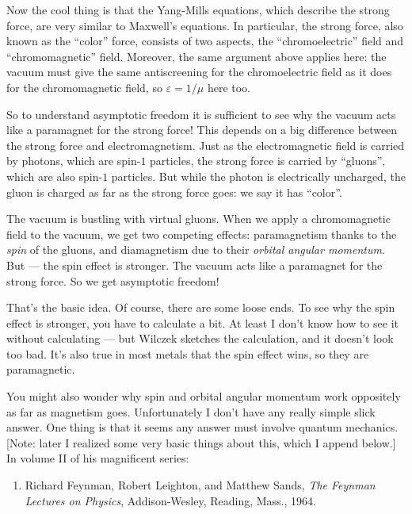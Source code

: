 \documentclass{article}
\def\tightlist{}
\begin{document}
Now the cool thing is that the Yang-Mills equations, which describe the
strong force, are very similar to Maxwell's equations. In particular,
the strong force, also known as the ``color'' force, consists of two
aspects, the ``chromoelectric'' field and ``chromomagnetic'' field.
Moreover, the same argument above applies here: the vacuum must give the
same antiscreening for the chromoelectric field as it does for the
chromomagnetic field, so \(\varepsilon = 1/\mu\) here too.

So to understand asymptotic freedom it is sufficient to see why the
vacuum acts like a paramagnet for the strong force! This depends on a
big difference between the strong force and electromagnetism. Just as
the electromagnetic field is carried by photons, which are spin-\(1\)
particles, the strong force is carried by ``gluons'', which are also
spin-\(1\) particles. But while the photon is electrically uncharged,
the gluon is charged as far as the strong force goes: we say it has
``color''.

The vacuum is bustling with virtual gluons. When we apply a
chromomagnetic field to the vacuum, we get two competing effects:
paramagnetism thanks to the \emph{spin} of the gluons, and diamagnetism
due to their \emph{orbital angular momentum}. But --- the spin effect is
stronger. The vacuum acts like a paramagnet for the strong force. So we
get asymptotic freedom!

That's the basic idea. Of course, there are some loose ends. To see why
the spin effect is stronger, you have to calculate a bit. At least I
don't know how to see it without calculating --- but Wilczek sketches
the calculation, and it doesn't look too bad. It's also true in most
metals that the spin effect wins, so they are paramagnetic.

You might also wonder why spin and orbital angular momentum work
oppositely as far as magnetism goes. Unfortunately I don't have any
really simple slick answer. One thing is that it seems any answer must
involve quantum mechanics. {[}Note: later I realized some very basic
things about this, which I append below.{]} In volume II of his
magnificent series:

\begin{enumerate}
\def\labelenumi{\arabic{enumi})}
\setcounter{enumi}{3}
\tightlist
\item
  Richard Feynman, Robert Leighton, and Matthew Sands, \emph{The Feynman
  Lectures on Physics}, Addison-Wesley, Reading, Mass., 1964.
\end{enumerate}
\end{document}
